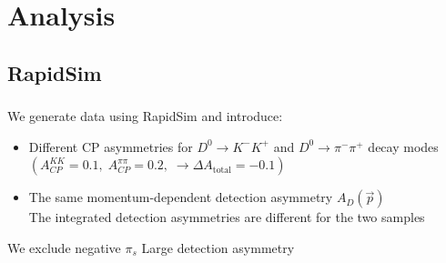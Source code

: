 \documentclass{beamer}
\begin{document}
\section{Analysis}
\subsection{RapidSim}

\begin{frame}
      \frametitle{\insertsubsectionhead}
      \rightarrow We generate data using RapidSim and introduce:
      \begin{itemize}
            \item Different CP asymmetries for $D^0\to K^-K^+$ and $D^0\to\pi^-\pi^+$ decay modes $\left(A_{CP}^{KK} = 0.1,\; A_{CP}^{\pi\pi} = 0.2,\; \rightarrow \Delta A_\text{total} = -0.1\right)$
            \item The same momentum-dependent detection asymmetry $A_D(\vec{p})$ \\ \rightarrow The integrated detection asymmetries are different for the two samples
      \end{itemize}
      \rightarrow We exclude negative $\pi_s$ \Rightarrow Large detection asymmetry
      \begin{figure}
            \centering
      \end{figure}
\end{frame}
\end{document}
